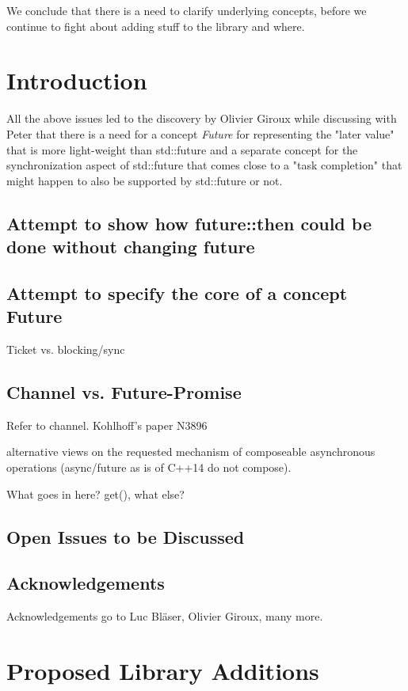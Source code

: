 \documentclass[ebook,11pt,article]{memoir}
\begin{document}
We conclude that there is a need to clarify underlying concepts, before we continue to fight about adding stuff to the library and where. 



\chapter{Introduction}
All the above issues led to the discovery by Olivier Giroux while discussing with Peter that there is a need for a concept \emph{Future} for representing the "later value" that is more light-weight than std::future and a separate concept for the synchronization aspect of std::future that comes close to a "task completion" that might happen to also be supported by std::future or not.

\section{Attempt to show how future::then could be done without changing future}

\section{Attempt to specify the core of a concept Future}
Ticket vs. blocking/sync

\section{Channel vs. Future-Promise}
Refer to channel. Kohlhoff's paper N3896

alternative views on the requested mechanism of composeable asynchronous operations (async/future as is of C++14 do not compose).


What goes in here? get(), what else?
\section{Open Issues to be Discussed}

\section{Acknowledgements}
Acknowledgements go to Luc Bläser, Olivier Giroux, many more.

\chapter{Proposed Library Additions}
%
%




\end{document}
